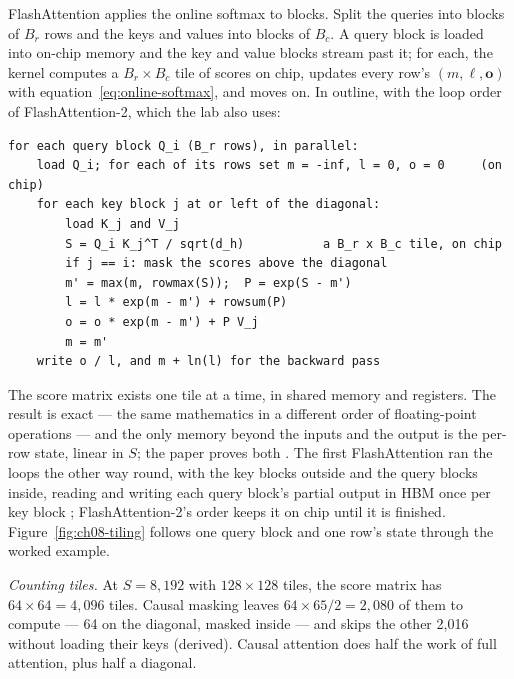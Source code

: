 FlashAttention \cite{dao2022flashattention} applies the online softmax to
blocks. Split the queries into blocks of $B_r$ rows and the keys and values
into blocks of $B_c$. A query block is loaded into on-chip memory and the key
and value blocks stream past it; for each, the kernel computes a
$B_r \times B_c$ tile of scores on chip, updates every row's
$(m, \ell, \mathbf{o})$ with equation~\eqref{eq:online-softmax}, and moves on.
In outline, with the loop order of FlashAttention-2, which the lab also uses:

\begin{verbatim}
for each query block Q_i (B_r rows), in parallel:
    load Q_i; for each of its rows set m = -inf, l = 0, o = 0     (on chip)
    for each key block j at or left of the diagonal:
        load K_j and V_j
        S = Q_i K_j^T / sqrt(d_h)           a B_r x B_c tile, on chip
        if j == i: mask the scores above the diagonal
        m' = max(m, rowmax(S));  P = exp(S - m')
        l = l * exp(m - m') + rowsum(P)
        o = o * exp(m - m') + P V_j
        m = m'
    write o / l, and m + ln(l) for the backward pass
\end{verbatim}

\noindent The score matrix exists one tile at a time, in shared memory and
registers. The result is exact --- the same mathematics in a different order of
floating-point operations --- and the only memory beyond the inputs and the
output is the per-row state, linear in $S$; the paper proves both
\cite[Theorem~1]{dao2022flashattention}. The first FlashAttention ran the loops
the other way round, with the key blocks outside and the query blocks inside,
reading and writing each query block's partial output in HBM once per key block
\cite[Algorithm~1]{dao2022flashattention}; FlashAttention-2's order keeps it on
chip until it is finished. Figure~\ref{fig:ch08-tiling} follows one query block
and one row's state through the worked example.


\emph{Counting tiles.} At $S = 8{,}192$ with $128 \times 128$ tiles, the score
matrix has $64 \times 64 = 4{,}096$ tiles. Causal masking leaves
$64 \times 65/2 = 2{,}080$ of them to compute --- 64 on the diagonal, masked
inside --- and skips the other 2,016 without loading their keys (derived).
Causal attention does half the work of full attention, plus half a diagonal.

